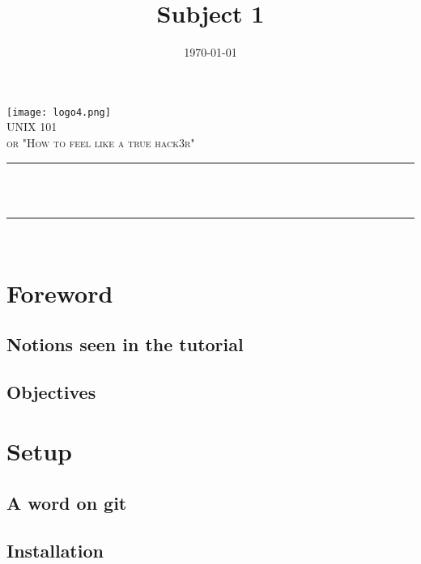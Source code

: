 \documentclass[12pt]{article}
\title{Subject 1}								%
\date{\today}											%
\makeatletter
\let\thetitle\@title
\let\thedate\@date
\makeatother
\begin{document}

\begin{titlepage}
	\centering
    \vspace*{0.5 cm}
    \texttt{[image: logo4.png]}\\[1.0 cm]
    \textsc{\LARGE \newline\newline UNIX 101}\\[2.0 cm]
	\textsc{\Large or "How to feel like a true hack3r"}\\[0.5 cm]
	\rule{\linewidth}{0.2 mm} \\[0.4 cm]
	{ \huge \bfseries \thetitle}\\
	\rule{\linewidth}{0.2 mm} \\[1.5 cm]
	
    \thedate
    
    
    
	
\end{titlepage}


\tableofcontents
\pagebreak


\section{Foreword}
\subsection{Notions seen in the tutorial}
\subsection{Objectives}

\section{Setup}
\subsection{A word on git}
\subsection{Installation}
\end{document}
